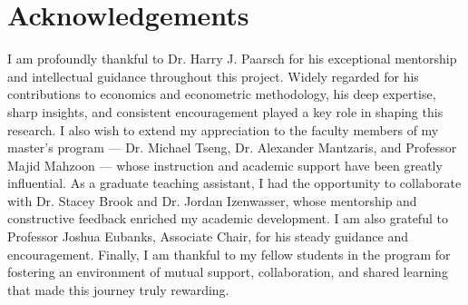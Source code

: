 \section{Acknowledgements}
I am profoundly thankful to Dr. Harry J. Paarsch for his exceptional mentorship and intellectual guidance throughout this project. Widely regarded for his contributions to economics and econometric methodology, his deep expertise, sharp insights, and consistent encouragement played a key role in shaping this research.
I also wish to extend my appreciation to the faculty members of my master’s program — Dr. Michael Tseng, Dr. Alexander Mantzaris, and Professor Majid Mahzoon — whose instruction and academic support have been greatly influential.
As a graduate teaching assistant, I had the opportunity to collaborate with Dr. Stacey Brook and Dr. Jordan Izenwasser, whose mentorship and constructive feedback enriched my academic development. I am also grateful to Professor Joshua Eubanks, Associate Chair, for his steady guidance and encouragement.
Finally, I am thankful to my fellow students in the program for fostering an environment of mutual support, collaboration, and shared learning that made this journey truly rewarding.